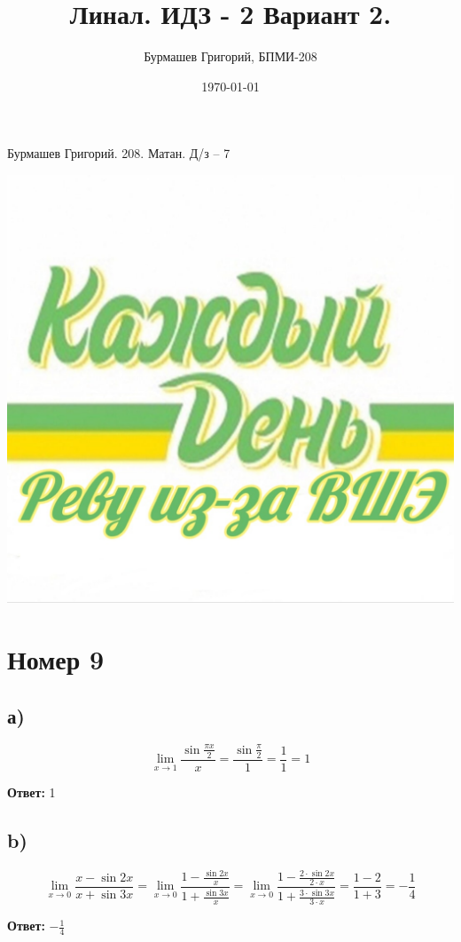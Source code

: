\documentclass[a4paper,12pt]{article}
\author{Бурмашев Григорий, БПМИ-208}
\title{Линал. ИДЗ - 2 Вариант 2.}
\date{\today}
\begin{document}
\begin{center}
Бурмашев Григорий.  208. Матан. Д/з -- 7
\end{center}
\begin{center}
\includegraphics[scale=0.3]{123.jpg}
\end{center}
\newpage
\section*{Номер 9}
\subsection*{а)}
\[
\lim_{x \rightarrow 1} \frac{\sin \frac{\pi x}{2}}{x} = \frac{\sin \frac{\pi }{2}}{1} = \frac{1}{1} = 1
\]
\begin{center}
\textbf{Ответ: } 1
\end{center}

\subsection*{b)}
\[
\lim_{x \rightarrow 0} \frac{x - \sin 2x}{x + \sin 3x} =  \lim_{x \rightarrow 0} \frac{1 - \frac{\sin 2x}{x}}{1 + \frac{\sin 3x}{x}} = \lim_{x \rightarrow 0} \frac{1 - \frac{2 \cdot \sin 2x}{2 \cdot x}}{1 + \frac{3 \cdot \sin 3x}{3 \cdot x}} = \frac{1 - 2}{1 + 3} = - \frac{1}{4}
\]
\begin{center}
\textbf{Ответ: } $-\frac{1}{4}$
\end{center}
\end{document}
